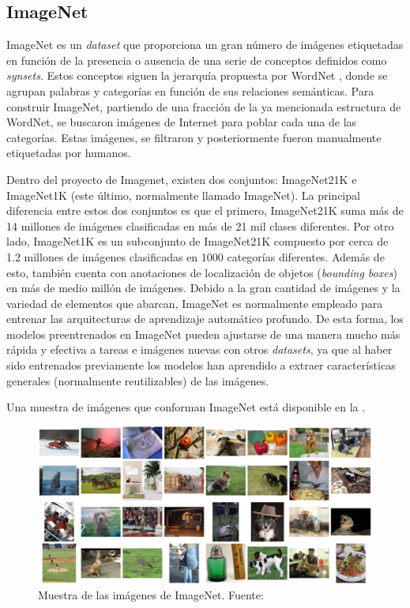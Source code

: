 \subsection{ImageNet}
ImageNet \cite{imagenet_cvpr09, ILSVRC15} es un \textit{dataset} que proporciona un gran número de imágenes etiquetadas en función de la presencia o ausencia de una serie de conceptos definidos como \textit{synsets}. Estos conceptos siguen la jerarquía propuesta por WordNet \cite{wordnet}, donde se agrupan palabras y categorías en función de sus relaciones semánticas. Para construir ImageNet, partiendo de una fracción de la ya mencionada estructura de WordNet, se buscaron imágenes de Internet para poblar cada una de las categorías. Estas imágenes, se filtraron y posteriormente fueron manualmente etiquetadas por humanos. 

Dentro del proyecto de Imagenet, existen dos conjuntos: ImageNet21K e ImageNet1K (este último, normalmente llamado ImageNet). La principal diferencia entre estos dos conjuntos es que el primero, ImageNet21K suma más de 14 millones de imágenes clasificadas en más de 21 mil clases diferentes. Por otro lado, ImageNet1K es un subconjunto de ImageNet21K compuesto por cerca de 1.2 millones de imágenes clasificadas en 1000 categorías diferentes. Además de esto, también cuenta con anotaciones de localización de objetos (\textit{bounding boxes}) en más de medio millón de imágenes. Debido a la gran cantidad de imágenes y la variedad de elementos que abarcan, ImageNet es normalmente empleado para entrenar las arquitecturas de aprendizaje automático profundo. De esta forma, los modelos preentrenados en ImageNet pueden ajustarse de una manera mucho más rápida y efectiva a tareas e imágenes nuevas con otros \textit{datasets}, ya que al haber sido entrenados previamente los modelos han aprendido a extraer características generales (normalmente reutilizables) de las imágenes.

Una muestra de imágenes que conforman ImageNet está disponible en la .
\begin{figure}[H]
\centering
\includegraphics[width=\textwidth]{imagenes/imagenet.png}
\caption{Muestra de las imágenes de ImageNet. Fuente: \cite{ILSVRC15}}
\label{fig:imagenet}
\end{figure}

